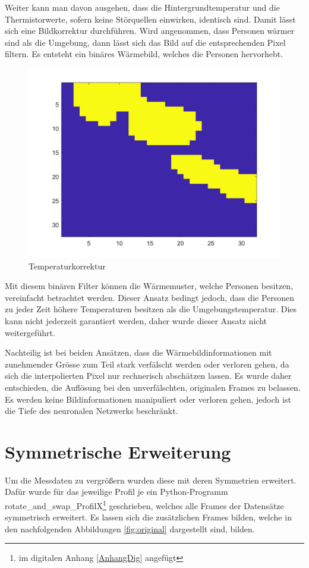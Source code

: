Weiter kann man davon ausgehen, dass die Hintergrundtemperatur und die Thermistorwerte, sofern keine Störquellen einwirken, identisch sind. Damit lässt sich eine Bildkorrektur durchführen. Wird angenommen, dass Personen wärmer sind als die Umgebung, dann lässt sich das Bild auf die entsprechenden Pixel filtern. Es entsteht ein binäres Wärmebild, welches die Personen hervorhebt. 

\begin{figure}[H]
	\centering
	\includegraphics[width=0.5\linewidth]{fig/interpol_3}
    \caption[Temperaturkorrektur]{Temperaturkorrektur}
   \label{fig:interpol3}
\end{figure}

Mit diesem binären Filter können die Wärmemuster, welche Personen besitzen, vereinfacht betrachtet werden. Dieser Ansatz bedingt jedoch, dass die Personen zu jeder Zeit höhere Temperaturen besitzen als die Umgebungstemperatur. Dies kann nicht jederzeit garantiert werden, daher wurde dieser Ansatz nicht weitergeführt.

Nachteilig ist bei beiden Ansätzen, dass die Wärmebildinformationen mit zunehmender Grösse zum Teil stark verfälscht werden oder verloren gehen, da sich die interpolierten Pixel nur rechnerisch abschätzen lassen. Es wurde daher entschieden, die Auflösung bei den unverfälschten, originalen Frames zu belassen. Es werden keine Bildinformationen manipuliert oder verloren gehen, jedoch ist die Tiefe des neuronalen Netzwerks beschränkt.

\section{Symmetrische Erweiterung}
\label{sec:Symmetrische Erweiterung}

Um die Messdaten zu vergrößern wurden diese mit deren Symmetrien erweitert. Dafür wurde für das jeweilige Profil je ein Python-Programm rotate\_and\_swap\_ProfilX\footnote{im digitalen Anhang \ref{AnhangDig} angefügt}  geschrieben, welches alle Frames der Datensätze symmetrisch erweitert.  Es lassen sich die zusätzlichen Frames bilden, welche in den nachfolgenden Abbildungen \ref{fig:original} dargestellt sind, bilden.

